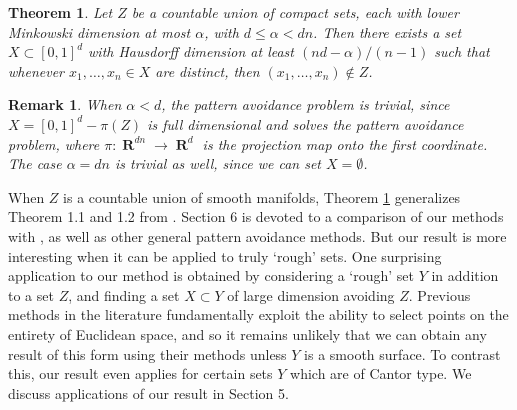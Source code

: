 \documentclass[dvipsnames,letterpaper,12pt]{article}
\theoremstyle{plain}
\newtheorem{theorem}{Theorem}
\newtheorem*{remark}{Remark}
\DeclareMathOperator{\RR}{\mathbf{R}}
\begin{document}
\begin{theorem}\label{mainTheorem}
	Let $Z$ be a countable union of compact sets, each with lower Minkowski dimension at most $\alpha$, with $d \leq \alpha < dn$. Then there exists a set $X \subset [0,1]^d$ with Hausdorff dimension at least $(nd - \alpha)/(n-1)$ such that whenever $x_1, \dots, x_n \in X$ are distinct, then $(x_1, \dots, x_n) \not \in Z$.
\end{theorem}

\begin{remark}
	When $\alpha < d$, the pattern avoidance problem is trivial, since $X = [0,1]^d - \pi(Z)$ is full dimensional and solves the pattern avoidance problem, where $\pi \colon \RR^{dn} \to \RR^d$ is the projection map onto the first coordinate. The case $\alpha = dn$ is trivial as well, since we can set $X = \emptyset$.

\end{remark}


When $Z$ is a countable union of smooth manifolds, Theorem \ref{mainTheorem} generalizes Theorem 1.1 and 1.2 from \cite{MalabikaRob}. Section 6 is devoted to a comparison of our methods with \cite{MalabikaRob}, as well as other general pattern avoidance methods. But our result is more interesting when it can be applied to truly `rough' sets. One surprising application to our method is obtained by considering a `rough' set $Y$ in addition to a set $Z$, and finding a set $X \subset Y$ of large dimension avoiding $Z$. Previous methods in the literature fundamentally exploit the ability to select points on the entirety of Euclidean space, and so it remains unlikely that we can obtain any result of this form using their methods unless $Y$ is a smooth surface. To contrast this, our result even applies for certain sets $Y$ which are of Cantor type. We discuss applications of our result in Section 5.

\end{document}
